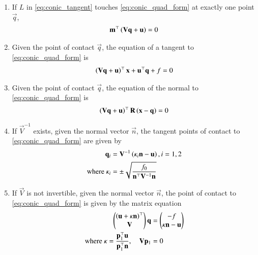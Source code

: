 \begin{enumerate}[label=\thesubsection.\arabic*,ref=\thesubsection.\theenumi]
\item
  If $L$ in \eqref{eq:conic_tangent} touches \eqref{eq:conic_quad_form} at exactly one point $\vec{q}$, 
  \begin{align}
  \mathbf{m}^{\top}\left(\mathbf{V}\mathbf{q}+\mathbf{u}\right) = 0
  \label{eq:conic_tangent_mq}
  \end{align}
\item
  Given the point of contact $\vec{q}$, the equation of a tangent to \eqref{eq:conic_quad_form} is 
  \begin{align}
  \left(\mathbf{V}\mathbf{q}+\mathbf{u}\right)^{\top}\mathbf{x}+\mathbf{u}^{\top}\mathbf{q}+f = 0
  \label{eq:conic_tangent_final}
  \end{align}
\item
  Given the point of contact $\vec{q}$, the equation of the normal to \eqref{eq:conic_quad_form} is 
  \begin{align}
    \left(\mathbf{V}\mathbf{q}+\mathbf{u}\right)^{\top}\mathbf{R}\left(\mathbf{x}-\mathbf{q}\right) =0
  \label{eq:conic_normal_final}
  \end{align}
\item
	\label{prop:conic-p-contact-nonparab}
  If $\vec{V}^{-1}$ exists, given the normal vector $\vec{n}$, the tangent points of contact to \eqref{eq:conic_quad_form} are given by
\begin{align}
  \begin{split}
\mathbf{q}_i &= \mathbf{V}^{-1}\left(\kappa_i \mathbf{n}-\mathbf{u}\right), i = 1,2
\\
\text{where }\kappa_i &= \pm \sqrt{
\frac{
f_0
}
{
\mathbf{n}^{\top}\mathbf{V}^{-1}\mathbf{n}
}
}
  \end{split}
\label{eq:conic_tangent_qk}
\end{align}
\item
  If $\vec{V}$ is not invertible,  given the normal vector $\vec{n}$, the point of contact to \eqref{eq:conic_quad_form} is given by the matrix equation
\begin{align}
\label{eq:conic_tangent_q_eigen}
\begin{pmatrix}
\mathbf{\left(u+\kappa \mathbf{n}\right)}^{\top} \\ \mathbf{V}
\end{pmatrix}
\mathbf{q} &= 
\begin{pmatrix}
-f
\\
\kappa\mathbf{n}-\mathbf{u}
\end{pmatrix}
\\
\text{where }  \kappa = \frac{\mathbf{p}_1^{\top}\mathbf{u}}{\mathbf{p}_1^{\top}\mathbf{n}}, \quad \mathbf{V}\mathbf{p}_1 &= 0
\label{eq:conic_tangent_qk_eigen}
\end{align}


\end{enumerate}
